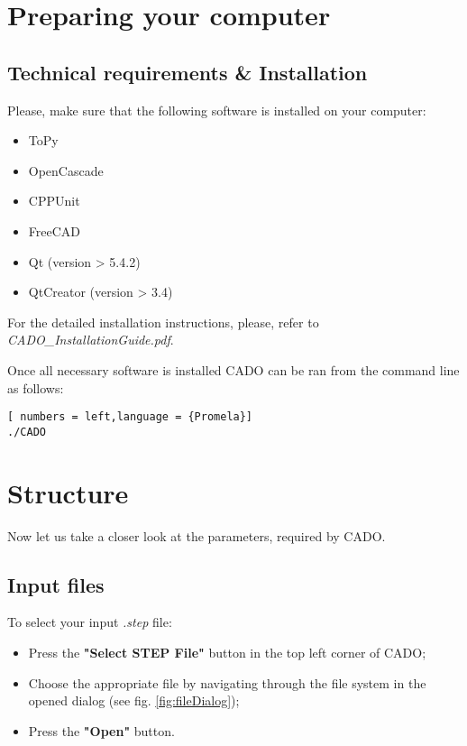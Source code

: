 \documentclass[
12pt, %
a4paper, %
oneside, %
headinclude,footinclude, %
BCOR5mm, %
]{scrartcl}
\begin{document}

\newpage %


\section{Preparing your computer}
\label{sec:prep}
\subsection{Technical requirements \& Installation}
Please, make sure that the following software is installed on your computer:
\begin{itemize}
\item ToPy
\item OpenCascade
\item CPPUnit
\item FreeCAD
\item Qt (version > 5.4.2)
\item QtCreator (version > 3.4) 
\end{itemize}

For the detailed installation instructions, please, refer to \\ \textit{CADO\_InstallationGuide.pdf}.

Once all necessary software is installed CADO can be ran from the command line as follows:
\begin{lstlisting}[ numbers = left,language = {Promela}]
./CADO
\end{lstlisting}


\section{Structure}
\label{sec:structure}
Now let us take a closer look at the parameters, required by CADO.

\subsection{Input files}
To select your input \textit{.step} file:
\begin{itemize}
\item Press the \textbf{"Select STEP File"} button in the top left corner of CADO;
\item Choose the appropriate file by navigating through the file system in the opened dialog (see fig. \ref{fig:fileDialog});
\item Press the \textbf{"Open"} button.
\end{itemize}
\end{document}
